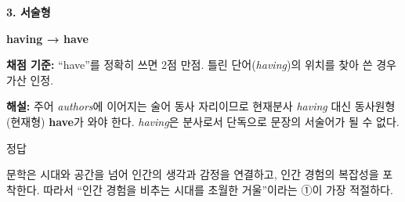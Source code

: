 \documentclass[11pt,a4paper]{article}
\newcommand{\sol}[2]{\vspace{6pt}{\sffamily\bfseries #1} \quad 정답 \fbox{#2}\par\vspace{1pt}}
\begin{document}
\vspace{4pt}
{\sffamily\bfseries 3. 서술형}\par\vspace{2pt}
 \quad \textbf{having → have}\par\vspace{3pt}
\textbf{채점 기준:} ``have''를 정확히 쓰면 2점 만점. 틀린 단어(\textit{having})의 위치를 찾아 쓴 경우 가산 인정.\par\vspace{3pt}
\textbf{해설:} 주어 \textit{authors}에 이어지는 술어 동사 자리이므로 현재분사 \textit{having} 대신 동사원형(현재형) \textbf{have}가 와야 한다. \textit{having}은 분사로서 단독으로 문장의 서술어가 될 수 없다.

\vspace{8pt}
\sol{4. 제목}{①}
문학은 시대와 공간을 넘어 인간의 생각과 감정을 연결하고, 인간 경험의 복잡성을 포착한다. 따라서 ``인간 경험을 비추는 시대를 초월한 거울''이라는 ①이 가장 적절하다.
\end{document}
